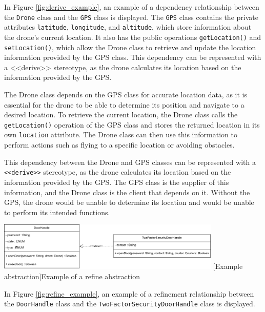 \documentclass[
	12pt,
    a4paper,
    egregdoesnotlikesansseriftitles, %
    toc=chapterentrywithdots,
    oneside, openany,
    titlepage,
    parskip=half,
    headings=normal,  %
    listof=totoc,
    bibliography=totoc,
    index=totoc,
    captions=tableheading,  %
    listof=flat,
    numbers=noenddot, %
    final]
    {scrbook}
\begin{document}
In Figure \ref{fig:derive_example}, an example of a dependency relationship between the \texttt{Drone} class and the \texttt{GPS} class is displayed. 
The \texttt{GPS} class contains the private attributes \texttt{latitude}, \texttt{longitude}, and \texttt{altitude}, which store information about the drone's current location. It also has the public operations \texttt{getLocation()} and \texttt{setLocation()}, which allow the Drone class to retrieve and update the location information provided by the GPS class.
This dependency can be represented with a <<derive>> stereotype, as the drone calculates its location based on the information provided by the GPS.

The Drone class depends on the GPS class for accurate location data, as it is essential for the drone to be able to determine its position and navigate to a desired location. To retrieve the current location, the Drone class calls the \texttt{getLocation()} operation of the GPS class and stores the returned location in its own \texttt{location} attribute. The Drone class can then use this information to perform actions such as flying to a specific location or avoiding obstacles.

This dependency between the Drone and GPS classes can be represented with a \texttt{<<derive>>} stereotype, as the drone calculates its location based on the information provided by the GPS. 
The GPS class is the supplier of this information, and the Drone class is the client that depends on it. 
Without the GPS, the drone would be unable to determine its location and would be unable to perform its intended functions.



\vspace{1em}
\begin{minipage}{\linewidth}
	\centering
	\includegraphics[width=0.8\textwidth]{figures/dependencies/refine.jpg}
	[Example abstraction]{Example of a refine abstraction}
	\label{fig:refine_example}
\end{minipage}
\vspace{1em}

In Figure \ref{fig:refine_example}, an example of a refinement relationship between the \texttt{DoorHandle} class and the \texttt{TwoFactorSecurityDoorHandle} class is displayed.
\end{document}
